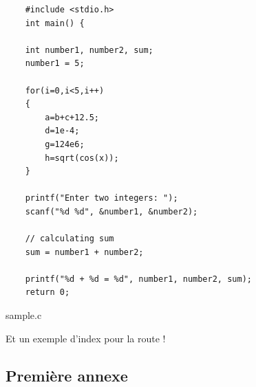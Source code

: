 \documentclass[a4paper,11pt]{report}    %
\begin{document}
\begin{listing}[H]
\begin{verbatim}
    #include <stdio.h>
    int main() {    

    int number1, number2, sum;
    number1 = 5;
    
    for(i=0,i<5,i++)
    {
        a=b+c+12.5;
        d=1e-4;
        g=124e6;
        h=sqrt(cos(x));
    }
    
    printf("Enter two integers: ");
    scanf("%d %d", &number1, &number2);

    // calculating sum
    sum = number1 + number2;      
    
    printf("%d + %d = %d", number1, number2, sum);
    return 0;
\end{verbatim}
\caption{sample.c}
\label{lst:sample.c}
\end{listing}

Et un exemple d'index pour la route !



\newpage
\listoffigures

\newpage
\listoftables

\newpage
\listofmyequations

\newpage
\listoflistings

\newpage
\printindex

\newpage
\printbibliography[heading=bibintoc]



\begin{appendices}

\chapter{Première annexe}

\cite{CitekeyBook}



\end{appendices}

\end{document}
